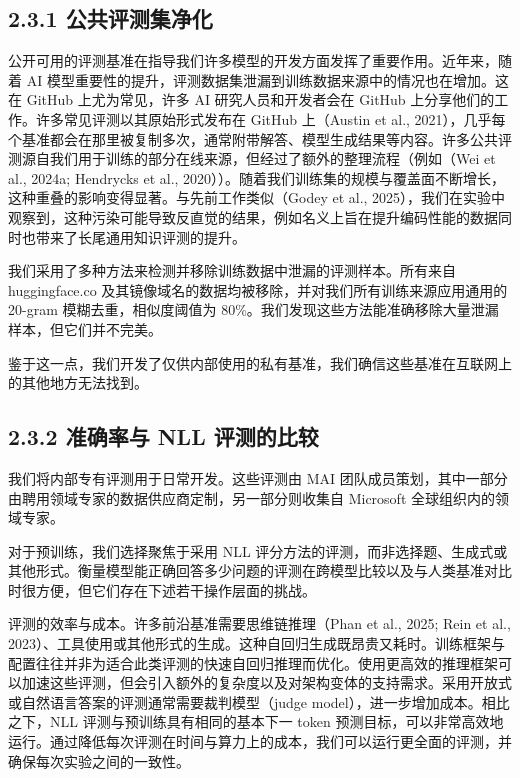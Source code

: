 \subsection{2.3.1 公共评测集净化}\label{public-evaluation-decontamination}

公开可用的评测基准在指导我们许多模型的开发方面发挥了重要作用。近年来，随着 AI 模型重要性的提升，评测数据集泄漏到训练数据来源中的情况也在增加。这在 GitHub 上尤为常见，许多 AI 研究人员和开发者会在 GitHub 上分享他们的工作。许多常见评测以其原始形式发布在 GitHub 上（Austin et al., 2021），几乎每个基准都会在那里被复制多次，通常附带解答、模型生成结果等内容。许多公共评测源自我们用于训练的部分在线来源，但经过了额外的整理流程（例如（Wei et al., 2024a; Hendrycks et al., 2020））。随着我们训练集的规模与覆盖面不断增长，这种重叠的影响变得显著。与先前工作类似（Godey et al., 2025），我们在实验中观察到，这种污染可能导致反直觉的结果，例如名义上旨在提升编码性能的数据同时也带来了长尾通用知识评测的提升。

我们采用了多种方法来检测并移除训练数据中泄漏的评测样本。所有来自 huggingface.co 及其镜像域名的数据均被移除，并对我们所有训练来源应用通用的 20-gram 模糊去重，相似度阈值为 80\%。我们发现这些方法能准确移除大量泄漏样本，但它们并不完美。



鉴于这一点，我们开发了仅供内部使用的私有基准，我们确信这些基准在互联网上的其他地方无法找到。

\subsection{2.3.2 准确率与 NLL 评测的比较}\label{comparison-of-accuracy-and-nll-evaluations}

我们将内部专有评测用于日常开发。这些评测由 MAI 团队成员策划，其中一部分由聘用领域专家的数据供应商定制，另一部分则收集自 Microsoft 全球组织内的领域专家。

对于预训练，我们选择聚焦于采用 NLL 评分方法的评测，而非选择题、生成式或其他形式。衡量模型能正确回答多少问题的评测在跨模型比较以及与人类基准对比时很方便，但它们存在下述若干操作层面的挑战。

评测的效率与成本。许多前沿基准需要思维链推理（Phan et al., 2025; Rein et al., 2023）、工具使用或其他形式的生成。这种自回归生成既昂贵又耗时。训练框架与配置往往并非为适合此类评测的快速自回归推理而优化。使用更高效的推理框架可以加速这些评测，但会引入额外的复杂度以及对架构变体的支持需求。采用开放式或自然语言答案的评测通常需要裁判模型（judge model），进一步增加成本。相比之下，NLL 评测与预训练具有相同的基本下一 token 预测目标，可以非常高效地运行。通过降低每次评测在时间与算力上的成本，我们可以运行更全面的评测，并确保每次实验之间的一致性。

